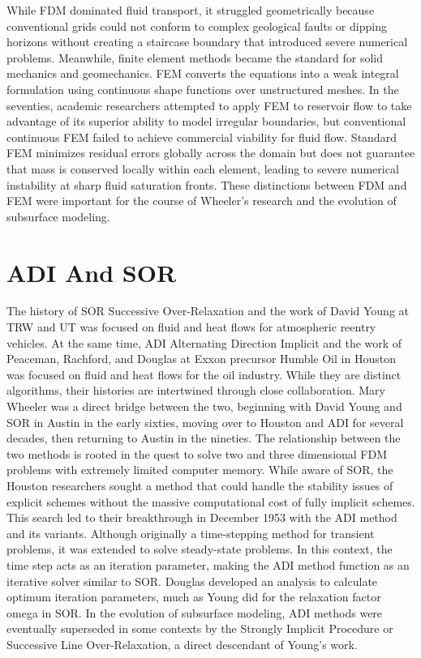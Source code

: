 While FDM dominated fluid transport, it struggled geometrically because conventional grids could not conform to complex geological faults or dipping horizons without creating a staircase boundary that introduced severe numerical problems. Meanwhile, finite element methods became the standard for solid mechanics and geomechanics. FEM converts the equations into a weak integral formulation using continuous shape functions over unstructured meshes. In the seventies, academic researchers attempted to apply FEM to reservoir flow to take advantage of its superior ability to model irregular boundaries, but conventional continuous FEM failed to achieve commercial viability for fluid flow. Standard FEM minimizes residual errors globally across the domain but does not guarantee that mass is conserved locally within each element, leading to severe numerical instability at sharp fluid saturation fronts. These distinctions between FDM and FEM were important for the course of Wheeler’s research and the evolution of subsurface modeling.

\section{ADI And SOR}

The history of SOR Successive Over-Relaxation and the work of David Young at TRW and UT was focused on fluid and heat flows for atmospheric reentry vehicles. At the same time, ADI Alternating Direction Implicit and the work of Peaceman, Rachford, and Douglas at Exxon precursor Humble Oil in Houston was focused on fluid and heat flows for the oil industry. While they are distinct algorithms, their histories are intertwined through close collaboration. Mary Wheeler was a direct bridge between the two, beginning with David Young and SOR in Austin in the early sixties, moving over to Houston and ADI for several decades, then returning to Austin in the nineties. The relationship between the two methods is rooted in the quest to solve two and three dimensional FDM problems with extremely limited computer memory. While aware of SOR, the Houston researchers sought a method that could handle the stability issues of explicit schemes without the massive computational cost of fully implicit schemes. This search led to their breakthrough in December 1953 with the ADI method and its variants. Although originally a time-stepping method for transient problems, it was extended to solve steady-state problems. In this context, the time step acts as an iteration parameter, making the ADI method function as an iterative solver similar to SOR. Douglas developed an analysis to calculate optimum iteration parameters, much as Young did for the relaxation factor omega in SOR. In the evolution of subsurface modeling, ADI methods were eventually superseded in some contexts by the Strongly Implicit Procedure or Successive Line Over-Relaxation, a direct descendant of Young's work.

